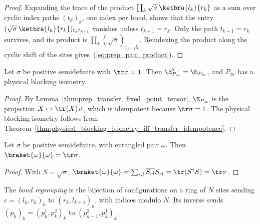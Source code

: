 \begin{proof}
    \leanok
    Expanding the trace of the product
    $\prod_k\sqrt\sigma\,\ketbra{l_k}{r_k}$ as a sum over cyclic index
    paths $(t_k)_k$, one index per bond, shows that the entry
    $(\sqrt\sigma\,\ketbra{l_k}{r_k})_{t_k t_{k+1}}$ vanishes unless
    $t_{k+1}=r_k$. Only the path $t_{k+1}=r_k$ survives, and its
    product is $\prod_k(\sqrt\sigma)_{r_{k-1}l_k}$. Reindexing the product
    along the cyclic shift of the sites gives~(\ref{eq:prep_pair_product}).
\end{proof}

\begin{lemma}
    \label{thm:prep_fixed_point_tensor_rfp}
    \leanok
    Let $\sigma$ be positive semidefinite with $\tr\sigma=1$. Then
    $\E_{P_\infty}^2=\E_{P_\infty}$, and $P_\infty$ has a physical blocking
    isometry.
\end{lemma}
\begin{proof}
    \leanok
    By Lemma~\ref{thm:prep_transfer_fixed_point_tensor},
    $\E_{P_\infty}$ is the projection $X\mapsto\tr(X)\,\sigma$, which is
    idempotent because $\tr\sigma=1$. The physical blocking isometry
    follows from
    Theorem~\ref{thm:physical_blocking_isometry_iff_transfer_idempotence}.
\end{proof}

\begin{lemma}
    \label{thm:prep_pair_norm}
    \leanok
    Let $\sigma$ be positive semidefinite, with entangled pair $\omega$.
    Then $\braket{\omega}{\omega}=\tr\sigma$.
\end{lemma}
\begin{proof}
    \leanok
    With $S=\sqrt\sigma$,
    $\braket{\omega}{\omega}=\sum_{r,l}\overline{S_{rl}}S_{rl}=\tr(S^\dagger S)=\tr\sigma$.
\end{proof}

\begin{definition}
    \label{def:prep_bond_regrouping}
    \leanok
    The \emph{bond regrouping} is the bijection of configurations on a ring of
    $N$ sites sending $c=(l_k,r_k)_k$ to $(r_k,l_{k+1})_k$, with indices
    modulo $N$. Its inverse sends $(p_k)_k=(p_k^1,p_k^2)_k$ to
    $(p_{k-1}^2,p_k^1)_k$.
\end{definition}

